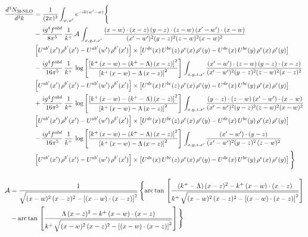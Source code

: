 \documentclass[9pt]{article}
\numberwithin{equation}{section}
\begin{document}
\begin{align}
\frac{d^{3}N_{3b\,\rm NLO}}{d^{3}k} & =\frac{1}{(2\pi)^{3}}\int_{w,w'}e^{-ik(w'-w)}\Bigg\{\notag \\ &-\frac{ig^{4}f^{abd}}{8\pi^{5}}\,\frac{1}{k^{+}}\,\mathcal{A}\,\int_{x,y,z,x'}
\frac{(x-w)\cdot(x-z)\,(y-z)\cdot(z-w)\,(x'-w')\cdot(x-w)}{(x'-w')^{2}(y-z)^{2}(z-w)^{2}(x-w)^{2}}\notag \\ & \left[U^{ab'}(x')\,\rho^{b'}(x')-U^{ab'}(w')\, \rho^{b'}(x')\right]\times \left[U^{de}(x)\,U^{bc}(z)\, \rho^{e}(x)\,\rho^{c}(y)-U^{de}(x)\,U^{bc}(y)\,\rho^{e}(x)\,\rho^{c}(y)\right]\notag \\ & -\frac{ig^{4}f^{abd}}{16\pi^{5}}\,\frac{1}{k^{+}}\,\log{\left[\frac{\left[k^{+}\,(x-w)-(k^{+}-\Lambda)\,(x-z)\right]^{2}}{\left[k^{+}\,(x-w)-\Lambda\,(x-z)\right]^{2}}\right]}\,\int_{x,y,z,x'}
\frac{(x'-w')\cdot(z-w)\,(y-z)\cdot(x-z)}{(x'-w')^{2}(y-z)^{2}(z-w)^{2}(x-z)^{2}}\notag \\
&\left[U^{ab'}(x')\,\rho^{b'}(x')-U^{ab'}(w')\, \rho^{b'}(x')\right]\times \left[U^{de}(x)\,U^{bc}(z)\, \rho^{e}(x)\,\rho^{c}(y)-U^{de}(x)\,U^{bc}(y)\,\rho^{e}(x)\,\rho^{c}(y)\right]\notag \\ &+ \frac{ig^{4}f^{abd}}{16\pi^{5}}\,\frac{1}{k^{+}}\,\log{\left[\frac{\left[k^{+}\,(x-w)-(k^{+}-\Lambda)\,(x-z)\right]^{2}}{\left[k^{+}\,(x-w)-\Lambda\,(x-z)\right]^{2}}\right]}\,\int_{x,y,z,x'}
\frac{(y-z)\cdot(z-w)\,(x'-w')\cdot(x-w)}{(x'-w')^{2}(y-z)^{2}(z-w)^{2}(x-w)^{2}}\notag \\ 
& \left[U^{ab'}(x')\,\rho^{b'}(x')-U^{ab'}(w')\, \rho^{b'}(x')\right]\times \left[U^{de}(x)\,U^{bc}(z)\, \rho^{e}(x)\,\rho^{c}(y)-U^{de}(x)\,U^{bc}(y)\,\rho^{e}(x)\,\rho^{c}(y)\right]\notag \\ & -\frac{ig^{4}f^{abd}}{16\pi^{5}}\,\frac{1}{k^{+}}\,\log{\left[\frac{\left[k^{+}\,(x-w)-(k^{+}-\Lambda)\,(x-z)\right]^{2}}{\left[k^{+}\,(x-w)-\Lambda\,(x-z)\right]^{2}}\right]}\,\int_{x,y,z,x'}
\frac{(x'-w')\cdot(y-z)}{(x'-w')^{2}(y-z)^{2}\,(z-w)^{2}}\notag \\ & \left[U^{ab'}(x')\,\rho^{b'}(x')-U^{ab'}(w')\, \rho^{b'}(x')\right]\times \left[U^{de}(x)\,U^{bc}(z)\, \rho^{e}(x)\,\rho^{c}(y)-U^{de}(x)\,U^{bc}(y)\,\rho^{e}(x)\,\rho^{c}(y)\right]\Bigg\}
\end{align}

\begin{align}
\mathcal{A} & = \frac{1}{\sqrt{(x-w)^{2}\,(x-z)^{2}-\left[(x-w)\cdot (x-z)\right]^{2}}}\, \Bigg\{\mathrm{arc\,tan}\,\left[\frac{(k^{+}-\Lambda)\,(x-z)^{2}-k^{+}\,(x-w)\cdot (x-z)}{k^{+}\,\sqrt{(x-w)^{2}\,(x-z)^{2}-\left[(x-w)\cdot (x-z)\right]^{2}}}\right]\notag \\ & - \mathrm{arc\,tan}\,\left[\frac{\Lambda\,(x-z)^{2}-k^{+}\,(x-w)\cdot (x-z)}{k^{+}\,\sqrt{(x-w)^{2}\,(x-z)^{2}-\left[(x-w)\cdot (x-z)\right]^{2}}}\right] \Bigg\} \nonumber
\end{align}
\end{document}
